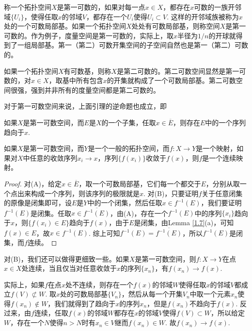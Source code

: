 \begin{para}[第一、第二可数性]
	称一个拓扑空间$X$是第一可数的，如果对每一点$x\in X$，都存在$x$可数的一族开邻域$\{U_i\}$，使得任取$x$的邻域$V$，都存在一个$U_i$使得$U_i\subset V$. 这样的开邻域族被称为$x$处的一个可数局部基。如果一个拓扑空间$X$处处有可数局部基，则称空间$X$是第一可数的。作为例子，度量空间是第一可数的，实际上，取$x$半径为$1/n$的开球就得到了一组局部基。第一（第二）可数开集空间的子空间自然也是第一（第二）可数的。

	如果一个拓扑空间$X$有可数基，则称$X$是第二可数的。第二可数空间显然是第一可数的，对$x\in X$，取基中所有包含$x$的开集就构成了一个可数局部基。第二可数空间很强，强到并非所有的度量空间都是第二可数的。

	对于第一可数空间来说，上面引理的逆命题也成立，即
	\begin{compactenum}[~~~(A)]\it 
	\item 如果$X$是第一可数空间，而$E$是$X$的一个子集，任取$x\in \overline{E}$，则存在$E$中的一个序列趋向于$x$.
	\item 如果$X$是第一可数空间，而$Y$是一个一般的拓扑空间，而$f:X\to Y$是一个映射，如果对$X$中任意的收敛序列$x_i\to x$，序列$\{f(x_i)\}$收敛于$f(x)$，则$f$是一个连续映射。
	\end{compactenum}

	\begin{proof}
	对(A)，给定$x\in \overline{E}$，取一个可数局部基，它们每一个都交于$E$，分别从取一个点出来构成一个序列，则该序列的极限就是$x$. 对(B)，只要证明$f$关于任意闭集的原像是闭集即可，设$E$是$Y$中的一个闭集，然后任取$x\in f^{-1}(E)$，我们要证明$f^{-1}(E)$是闭集。任取$x\in \overline{f^{-1}(E)}$，由(A)，存在一个$f^{-1}(E)$中的序列$\{x_i\}$趋向于$x$，则$\{f(x_i)\in E\}$趋向于$f(x)$，由于$E$是闭集，由Lemma \ref{1.7}(a)，可知$f(x)\in E$，故$x\in f^{-1}(E)$. 综上可知$f^{-1}(E)=\overline{f^{-1}(E)}$，所以$f^{-1}(E)$是闭集，而$f$连续。
	\end{proof}

	对(B)，我们还可以做得更细致一些。如果$X$是第一可数空间，则$f:X\to Y$在点$x\in X$处连续，当且仅当对任意收敛于$x$的序列$\{x_n\}$，有$f(x_n)\to f(x)$.

	实际上，如果$f$在点$x$处不连续，则存在一个$f(x)$的邻域$W$使得任取$x$的邻域$V$都成立$f(V)\not\subset W$. 取$x$处的可数局部基$\{V_n\}$，然后从每一个开集$V_n$中取一个元素$x_n$使得$f(x_n)\not\in W$，我们就得到了趋向于$x$的序列$x_n$，但是$f(x_n)$不趋向于$f(x)$. 反过来，由$f$连续，任取$f(x)$的邻域$W$都存在$x$的邻域$V$使得$f(V)\subset W$，所以给定$W$，存在一个$N$使得$n>N$时有$x_n\in V$继而$f(x_n)\in W$. 故$f(x_n)\to f(x)$.
\end{para}

